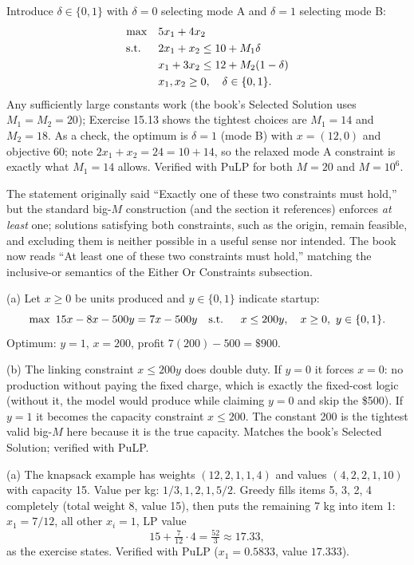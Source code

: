 
Introduce $\delta \in \{0,1\}$ with $\delta = 0$ selecting mode A and $\delta = 1$ selecting mode B:
\[
\begin{aligned}
\max\quad & 5x_1 + 4x_2\\
\text{s.t.}\;\;\quad & 2x_1 + x_2 \leq 10 + M_1\delta\\
& x_1 + 3x_2 \leq 12 + M_2(1-\delta)\\
& x_1, x_2 \geq 0,\quad \delta \in \{0,1\}.
\end{aligned}
\]
Any sufficiently large constants work (the book's Selected Solution uses $M_1 = M_2 = 20$); Exercise 15.13 shows the tightest choices are $M_1 = 14$ and $M_2 = 18$. As a check, the optimum is $\delta = 1$ (mode B) with $x = (12, 0)$ and objective 60; note $2x_1 + x_2 = 24 = 10 + 14$, so the relaxed mode A constraint is exactly what $M_1 = 14$ allows. Verified with PuLP for both $M = 20$ and $M = 10^6$.

\begin{qaflag}
The statement originally said ``Exactly one of these two constraints must hold,'' but the standard big-$M$ construction (and the section it references) enforces \emph{at least} one; solutions satisfying both constraints, such as the origin, remain feasible, and excluding them is neither possible in a useful sense nor intended. The book now reads ``At least one of these two constraints must hold,'' matching the inclusive-or semantics of the Either Or Constraints subsection.
\end{qaflag}


(a) Let $x \geq 0$ be units produced and $y \in \{0,1\}$ indicate startup:
\[
\max\ 15x - 8x - 500y = 7x - 500y
\quad \text{s.t.}\;\; \quad
x \leq 200y,\quad x \geq 0,\ y \in \{0,1\}.
\]
Optimum: $y = 1$, $x = 200$, profit $7(200) - 500 = \$900$.

(b) The linking constraint $x \leq 200y$ does double duty. If $y = 0$ it forces $x = 0$: no production without paying the fixed charge, which is exactly the fixed-cost logic (without it, the model would produce while claiming $y = 0$ and skip the \$500). If $y = 1$ it becomes the capacity constraint $x \leq 200$. The constant 200 is the tightest valid big-$M$ here because it is the true capacity. Matches the book's Selected Solution; verified with PuLP.


(a) The knapsack example has weights $(12, 2, 1, 1, 4)$ and values $(4, 2, 2, 1, 10)$ with capacity 15. Value per kg: $1/3, 1, 2, 1, 5/2$. Greedy fills items 5, 3, 2, 4 completely (total weight 8, value 15), then puts the remaining 7 kg into item 1: $x_1 = 7/12$, all other $x_i = 1$, LP value
\[
15 + \tfrac{7}{12}\cdot 4 = \tfrac{52}{3} \approx 17.33,
\]
as the exercise states. Verified with PuLP ($x_1 = 0.5833$, value $17.333$).

